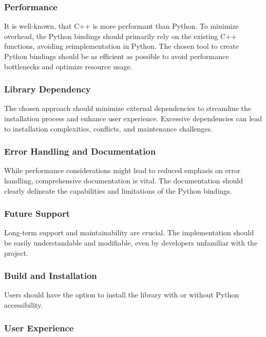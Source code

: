 \subsubsection{Performance}

It is well-known, that C++ is more performant than Python. To minimize overhead, the Python bindings should primarily rely on the existing C++ functions, avoiding reimplementation in Python. The chosen tool to create Python bindings should be as efficient as possible to avoid performance bottlenecks and optimize resource usage.

\subsubsection{Library Dependency}

The chosen approach should minimize external dependencies to streamline the installation process and enhance user experience. Excessive dependencies can lead to installation complexities, conflicts, and maintenance challenges.

\subsubsection{Error Handling and Documentation}

While performance considerations might lead to reduced emphasis on error handling, comprehensive documentation is vital. The documentation should clearly delineate the capabilities and limitations of the Python bindings.

\subsubsection{Future Support}

Long-term support and maintainability are crucial. The implementation should be easily understandable and modifiable, even by developers unfamiliar with the project.

\subsubsection{Build and Installation}

Users should have the option to install the library with or without Python accessibility.

\subsubsection{User Experience}

